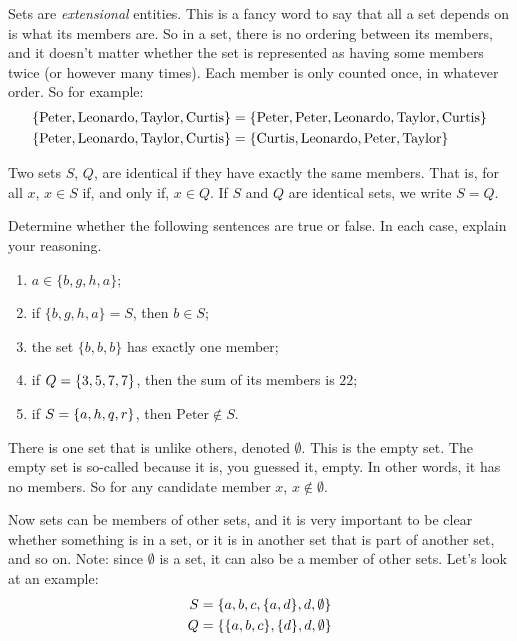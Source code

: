 Sets are \textit{extensional} entities. This is a fancy word to say that all a set depends on is what its members are. So in a set, there is no ordering between its members, and it doesn't matter whether the set is represented as having some members twice (or however many times). Each member is only counted once, in whatever order. So for example:
\begin{align*}
\{\text{Peter}, \text{Leonardo}, \text{Taylor}, \text{Curtis}\}&=\{\text{Peter}, \text{Peter}, \text{Leonardo}, \text{Taylor}, \text{Curtis}\}\\
\{\text{Peter}, \text{Leonardo}, \text{Taylor}, \text{Curtis}\}&= \{\text{Curtis}, \text{Leonardo}, \text{Peter}, \text{Taylor}\}
\end{align*}

\begin{defn} Two sets $S$, $Q$, are identical if they have exactly the same members. That is, for all $x$, $x \in S$ if, and only if, $x \in Q$. If $S$ and $Q$ are identical sets, we write $S=Q$.
\end{defn}

\begin{exc}
Determine whether the following sentences are true or false. In each case, explain your reasoning. 

\begin{enumerate}
	\item $a \in \{b, g, h, a\}$;
	\item if $\{b, g, h, a\}=S$, then $b \in S$;
	\item the set $\{b, b, b\}$ has exactly one member;
	\item if $Q=\{3, 5, 7, 7\}$, then the sum of its members is $22$;
	\item if $S=\{a, h, q, r\}$, then $\text{Peter} \notin S$.
\end{enumerate}
\end{exc}

There is one set that is unlike others, denoted $\emptyset$. This is the empty set. The empty set is so-called because it is, you guessed it, empty. In other words, it has no members. So for any candidate member $x$, $x \notin \emptyset$. 

Now sets can be members of other sets, and it is very important to be clear whether something is in a set, or it is in another set that is part of another set, and so on. Note: since $\emptyset$ is a set, it can also be a member of other sets. Let's look at an example: 
\begin{align*}
	S&=\{a, b, c, \{a, d\}, d, \emptyset\}\\
	Q&=\{\{a, b, c\}, \{d\}, d, \emptyset\}
\end{align*}

